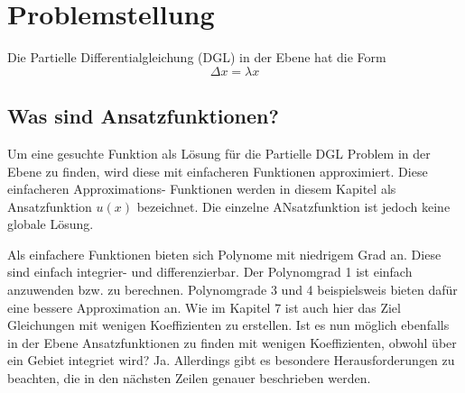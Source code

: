 %
%
%
\section{Problemstellung
\label{fem:section:problemstellung}}
Die Partielle Differentialgleichung (DGL) in der Ebene hat die Form 
\begin{equation}
	\Delta x = \lambda x
	\label{fem:equationPDE}
\end{equation} 

\subsection{Was sind Ansatzfunktionen?}
Um eine gesuchte Funktion als Lösung für die Partielle DGL Problem in der Ebene zu finden, wird diese mit einfacheren Funktionen approximiert. Diese einfacheren Approximations- Funktionen werden in diesem Kapitel als Ansatzfunktion $u(x)$ bezeichnet. Die einzelne ANsatzfunktion ist jedoch keine globale Lösung.

Als einfachere Funktionen bieten sich Polynome mit niedrigem Grad an. Diese sind einfach integrier- und differenzierbar. Der Polynomgrad 1 ist einfach anzuwenden bzw. zu berechnen. Polynomgrade 3 und 4 beispielsweis bieten dafür eine bessere Approximation an. Wie im Kapitel 7 ist auch hier das Ziel Gleichungen mit wenigen Koeffizienten zu erstellen. Ist es nun möglich ebenfalls in der Ebene Ansatzfunktionen zu finden mit wenigen Koeffizienten, obwohl über ein Gebiet integriet wird? Ja. Allerdings gibt es besondere Herausforderungen zu beachten, die in den nächsten Zeilen genauer beschrieben werden.


